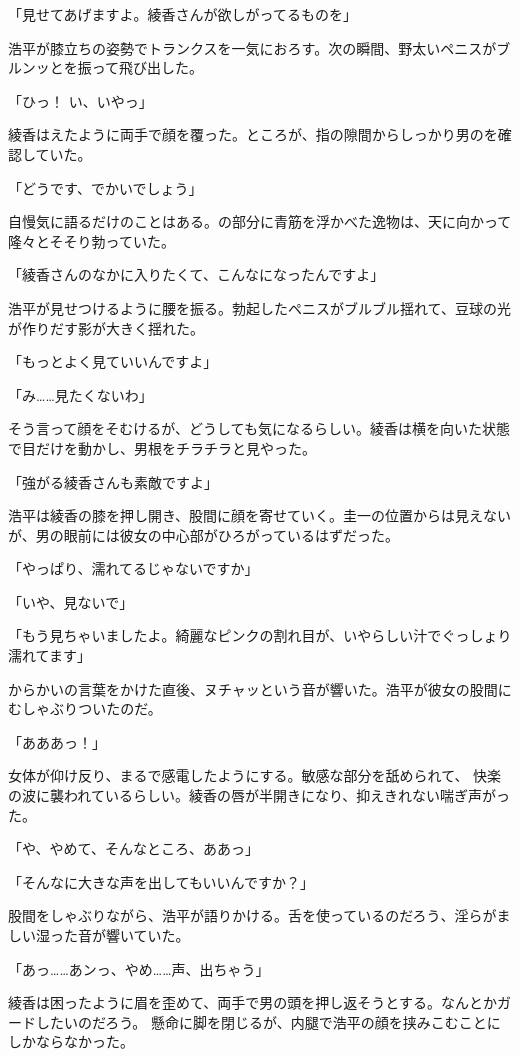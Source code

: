 ﻿\documentclass[
    book,tate,
    line_length=30zw,
    jafontsize=12pt,
    paper=b5j,
    landscape,
    ]{jlreq}
\begin{document}
「見せてあげますよ。綾香さんが欲しがってるものを」

浩平が膝立ちの姿勢でトランクスを一気におろす。次の瞬間、野太いペニスがブルンッとを振って飛び出した。

「ひっ！ い、いやっ」

綾香はえたように両手で顔を覆った。ところが、指の隙間からしっかり男のを確認していた。

「どうです、でかいでしょう」

自慢気に語るだけのことはある。の部分に青筋を浮かべた逸物は、天に向かって隆々とそそり勃っていた。

「綾香さんのなかに入りたくて、こんなになったんですよ」

浩平が見せつけるように腰を振る。勃起したペニスがブルブル揺れて、豆球の光が作りだす影が大きく揺れた。

「もっとよく見ていいんですよ」

「み……見たくないわ」

そう言って顔をそむけるが、どうしても気になるらしい。綾香は横を向いた状態で目だけを動かし、男根をチラチラと見やった。

「強がる綾香さんも素敵ですよ」

浩平は綾香の膝を押し開き、股間に顔を寄せていく。圭一の位置からは見えないが、男の眼前には彼女の中心部がひろがっているはずだった。

「やっぱり、濡れてるじゃないですか」

「いや、見ないで」

「もう見ちゃいましたよ。綺麗なピンクの割れ目が、いやらしい汁でぐっしょり濡れてます」

からかいの言葉をかけた直後、ヌチャッという音が響いた。浩平が彼女の股間にむしゃぶりついたのだ。

「あああっ！」

女体が仰け反り、まるで感電したようにする。敏感な部分を舐められて、
快楽の波に襲われているらしい。綾香の唇が半開きになり、抑えきれない喘ぎ声がった。

「や、やめて、そんなところ、ああっ」

「そんなに大きな声を出してもいいんですか？」

股間をしゃぶりながら、浩平が語りかける。舌を使っているのだろう、淫らがましい湿った音が響いていた。

「あっ……あンっ、やめ……声、出ちゃう」

綾香は困ったように眉を歪めて、両手で男の頭を押し返そうとする。なんとかガードしたいのだろう。
懸命に脚を閉じるが、内腿で浩平の顔を挟みこむことにしかならなかった。
\end{document}
